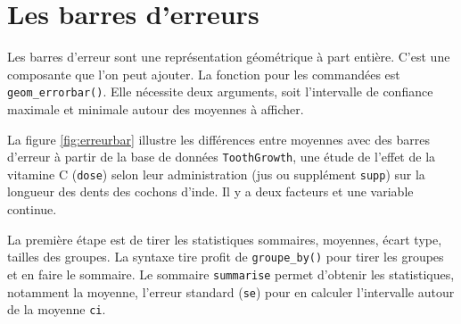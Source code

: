 \documentclass[
]{book}
\begin{document}
\hypertarget{les-barres-derreurs}{%
\section{Les barres d'erreurs}\label{les-barres-derreurs}}

Les barres d'erreur sont une représentation géométrique à part entière. C'est une composante que l'on peut ajouter. La fonction pour les commandées est \texttt{geom\_errorbar()}. Elle nécessite deux arguments, soit l'intervalle de confiance maximale et minimale autour des moyennes à afficher.

La figure \ref{fig:erreurbar} illustre les différences entre moyennes avec des barres d'erreur à partir de la base de données \texttt{ToothGrowth}, une étude de l'effet de la vitamine C (\texttt{dose}) selon leur administration (jus ou supplément \texttt{supp}) sur la longueur des dents des cochons d'inde. Il y a deux facteurs et une variable continue.

La première étape est de tirer les statistiques sommaires, moyennes, écart type, tailles des groupes. La syntaxe tire profit de \texttt{groupe\_by()} pour tirer les groupes et en faire le sommaire. Le sommaire \texttt{summarise} permet d'obtenir les statistiques, notamment la moyenne, l'erreur standard (\texttt{se}) pour en calculer l'intervalle autour de la moyenne \texttt{ci}.
\end{document}
